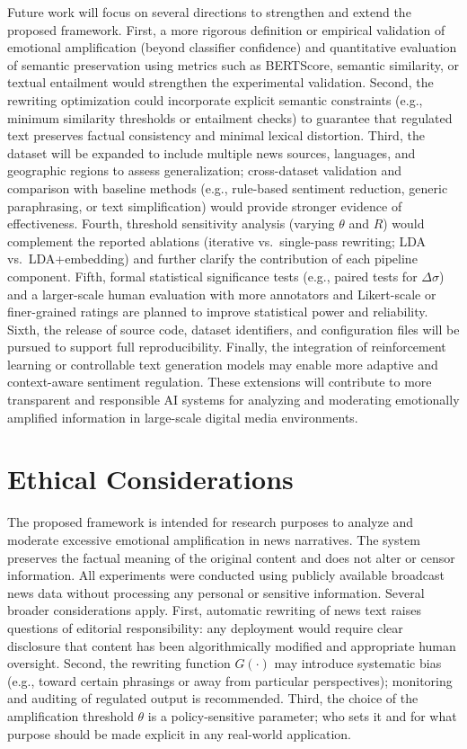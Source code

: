 \documentclass[final,1p,times]{elsarticle}
\begin{document}
Future work will focus on several directions to strengthen and extend the proposed framework. First, a more rigorous definition or empirical validation of emotional amplification (beyond classifier confidence) and quantitative evaluation of semantic preservation using metrics such as BERTScore, semantic similarity, or textual entailment would strengthen the experimental validation. Second, the rewriting optimization could incorporate explicit semantic constraints (e.g., minimum similarity thresholds or entailment checks) to guarantee that regulated text preserves factual consistency and minimal lexical distortion. Third, the dataset will be expanded to include multiple news sources, languages, and geographic regions to assess generalization; cross-dataset validation and comparison with baseline methods (e.g., rule-based sentiment reduction, generic paraphrasing, or text simplification) would provide stronger evidence of effectiveness. Fourth, threshold sensitivity analysis (varying $\theta$ and $R$) would complement the reported ablations (iterative vs.\ single-pass rewriting; LDA vs.\ LDA+embedding) and further clarify the contribution of each pipeline component. Fifth, formal statistical significance tests (e.g., paired tests for $\Delta\sigma$) and a larger-scale human evaluation with more annotators and Likert-scale or finer-grained ratings are planned to improve statistical power and reliability. Sixth, the release of source code, dataset identifiers, and configuration files will be pursued to support full reproducibility. Finally, the integration of reinforcement learning or controllable text generation models may enable more adaptive and context-aware sentiment regulation. These extensions will contribute to more transparent and responsible AI systems for analyzing and moderating emotionally amplified information in large-scale digital media environments.

\section{Ethical Considerations}

The proposed framework is intended for research purposes to analyze and moderate excessive emotional amplification in news narratives. The system preserves the factual meaning of the original content and does not alter or censor information. All experiments were conducted using publicly available broadcast news data without processing any personal or sensitive information. Several broader considerations apply. First, automatic rewriting of news text raises questions of editorial responsibility: any deployment would require clear disclosure that content has been algorithmically modified and appropriate human oversight. Second, the rewriting function $G(\cdot)$ may introduce systematic bias (e.g., toward certain phrasings or away from particular perspectives); monitoring and auditing of regulated output is recommended. Third, the choice of the amplification threshold $\theta$ is a policy-sensitive parameter; who sets it and for what purpose should be made explicit in any real-world application.





\end{document}
